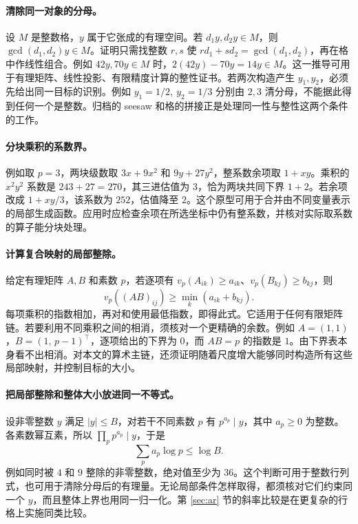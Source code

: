 \documentclass[UTF8,fontset=none,a4paper,11pt]{ctexart}
\theoremstyle{definition}
\begin{document}
\paragraph{清除同一对象的分母。}
设 $M$ 是整数格，$y$ 属于它张成的有理空间。若 $d_1y,d_2y\in M$，则 $\gcd(d_1,d_2)y\in M$。证明只需找整数 $r,s$ 使 $rd_1+sd_2=\gcd(d_1,d_2)$，再在格中作线性组合。例如 $42y,70y\in M$ 时，$2(42y)-70y=14y\in M$。这一推导可用于有理矩阵、线性投影、有限精度计算的整性证书。若两次构造产生 $y_1,y_2$，必须先给出同一目标的识别。例如 $y_1=1/2,\ y_2=1/3$ 分别由 $2,3$ 清分母，不能据此得到任何一个是整数。归档的 seesaw 和格的拼接正是处理同一性与整性这两个条件的工作。

\paragraph{分块乘积的系数界。}
例如取 $p=3$，两块级数取 $3x+9x^2$ 和 $9y+27y^2$，整系数余项取 $1+xy$。乘积的 $x^2y^2$ 系数是 $243+27=270$，其三进估值为 $3$，恰为两块共同下界 $1+2$。若余项改成 $1+xy/3$，该系数为 $252$，估值降至 $2$。这个原型可用于合并由不同变量表示的局部生成函数。应用时应检查余项在所选坐标中仍有整系数，并核对实际取系数的算子能分块处理。

\paragraph{计算复合映射的局部整除。}
给定有理矩阵 $A,B$ 和素数 $p$，若逐项有 $v_p(A_{ik})\ge a_{ik}$、$v_p(B_{kj})\ge b_{kj}$，则
\[
 v_p((AB)_{ij})\ge\min_k(a_{ik}+b_{kj}).
\]
每项乘积的指数相加，再对和使用最低指数，即得此式。它适用于任何有限矩阵链。若要利用不同乘积之间的相消，须核对一个更精确的余数。例如 $A=(1,1)$，$B=(1,\,p-1)^\top$，逐项给出的下界为 $0$，而 $AB=p$ 的指数是 $1$。由下界表本身看不出相消。对本文的算术主链，还须证明随着尺度增大能够同时构造所有这些局部映射，并控制目标的大小。

\paragraph{把局部整除和整体大小放进同一不等式。}
设非零整数 $y$ 满足 $|y|\le B$，对若干不同素数 $p$ 有 $p^{a_p}\mid y$，其中 $a_p\ge0$ 为整数。各素数幂互素，所以 $\prod_p p^{a_p}\mid y$，于是
\[
                 \sum_p a_p\log p\le\log B .
\]
例如同时被 $4$ 和 $9$ 整除的非零整数，绝对值至少为 $36$。这个判断可用于整数行列式，也可用于清除分母后的有理量。无论局部条件怎样取得，都须核对它们约束同一个 $y$，而且整体上界也用同一归一化。第 \ref{sec:ar} 节的斜率比较是在更复杂的行格上实施同类比较。
\end{document}
